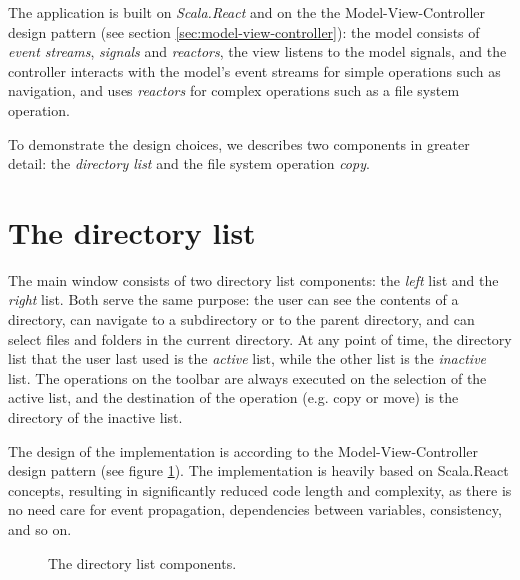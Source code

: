 The application is built on \emph{Scala.React} and on the the Model-View-Controller design pattern (see section \ref{sec:model-view-controller}): the model consists of \emph{event streams},  \emph{signals} and \emph{reactors}, the view listens to the model signals, and the controller interacts with the model's event streams for simple operations such as navigation, and uses \emph{reactors} for complex operations such as a file system operation.

To demonstrate the design choices, we describes two components in greater detail: the \emph{directory list} and the file system operation \emph{copy}.

\section{The directory list}

The main window consists of two directory list components: the \emph{left} list and the \emph{right} list. Both serve the same purpose: the user can see the contents of a directory, can navigate to a subdirectory or to the parent directory, and can select files and folders in the current directory. At any point of time, the directory list that the user last used is the \emph{active} list, while the other list is the \emph{inactive} list. The operations on the toolbar are always executed on the selection of the active list, and the destination of the operation (e.g. copy or move) is the directory of the inactive list.

The design of the implementation is according to the Model-View-Controller design pattern (see figure \ref{fig:mvc_pattern}). The implementation is heavily based on Scala.React concepts, resulting in significantly reduced code length and complexity, as there is no need care for event propagation, dependencies between variables, consistency, and so on.


\begin{figure}[h!]
\centering
{}
\caption{The directory list components.}
\label{fig:mvc_pattern}
\end{figure}


